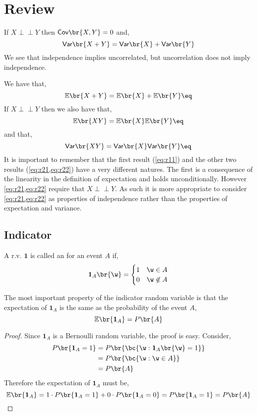 \documentclass{article}
\newcommand{\indep}{\!\!\perp\!\!\!\!\perp\!\!}
\newcommand{\Cov}{\textsf{Cov}}
\newcommand{\Var}{\textsf{Var}}
\newcommand{\Exp}{\mathbb{E}}
\newcommand{\ind}{\mathbf{1}}
\begin{document}
\titlePage

\tableOfContents

\disclaimer


\section{Review}

If $X \indep Y$ then $\Cov\br{X,Y} = 0$ and,
\[ \Var\br{X+Y} = \Var\br{X} + \Var\br{Y} \]
We see that independence implies uncorrelated, but uncorrelation does not imply independence.

\begin{remark}
    We have that,
    \[ \Exp\br{X + Y} = \Exp\br{X} + \Exp\br{Y} \eq \label{eq:r11}\]
    If $X\indep Y$ then we also have that,
    \[ \Exp\br{XY} = \Exp\br{X}\Exp\br{Y} \eq \label{eq:r21}\]
    and that,
    \[ \Var\br{XY} = \Var\br{X}\Var\br{Y} \eq \label{eq:r22}\]
    It is important to remember that the first result (\cref{eq:r11}) and the other two results (\cref{eq:r21,eq:r22}) have a very different natures. The first is a consequence of the linearity in the definition of expectation and holds unconditionally. However \cref{eq:r21,eq:r22} require that $X \indep Y$. As such it is more appropriate to consider \cref{eq:r21,eq:r22} as properties of independence rather than the properties of expectation and variance.
\end{remark}

\subsection{Indicator}

A r.v. $\ind$ is called an  for an event $A$ if,
\[ \ind_A \br{\w} = \begin{cases}
    1 & \w \in A \\
    0 & \w \not\in A
\end{cases} \]

The most important property of the indicator random variable is that the expectation of $\ind_A$ is the same as the probability of the event $A$,
\[ \Exp\br{\ind_{A}} = P\br{A} \]
\begin{proof}
    Since $\ind_A$ is a Bernoulli random variable, the proof is easy. Consider,
    \begin{align*}
    P\br{\ind_A = 1} &= P\br{\bc{\w: \ind_A\br{\w} = 1}} \\
    &= P\br{\bc{\w: \w \in A}} \\
    &= P\br{A}
    \end{align*}
    Therefore the expectation of $\ind_A$ must be,
    \[ \Exp\br{\ind_A} = 1 \cdot P\br{\ind_A = 1} + 0 \cdot P\br{\ind_A = 0} = P\br{\ind_A = 1} = P\br{A} \]
\end{proof}
\end{document}
